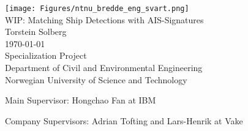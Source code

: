 \thispagestyle{empty}
\texttt{[image: Figures/ntnu\_bredde\_eng\_svart.png]}
\mbox{}\\[6pc]

\Huge{WIP: Matching Ship Detections with AIS-Signatures}\\[2pc]

\Large{Torstein Solberg}\\[1pc]
\large{\monthyeardate\today}\\[2pc]

Specialization Project\\
Department of Civil and Environmental Engineering\\
Norwegian University of Science and Technology






\vfill

\noindent Main Supervisor: Hongchao Fan at IBM

\noindent Company Supervisors: Adrian Tofting and Lars-Henrik at Vake


